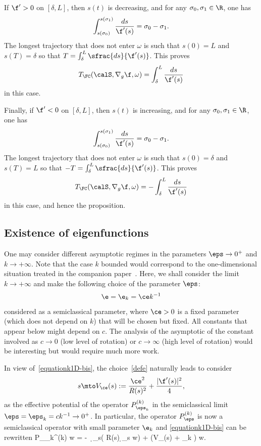 If $\f'>0$ on $[\delta, L]$, then $s(t)$ is decreasing, and for any $\sigma_0,\sigma_1\in \R$, one has
\[
\int_{s(\sigma_0)}^{s(\sigma_1)} \frac{ds}{\f'(s)} =\sigma_0- \sigma_1.
\]
The longest trajectory that does not enter $\omega$ is such that $s(0) = L$ and $s(T) =\delta$ so that $T = \int_\delta^{L} \sfrac{ds}{\f'(s)}$. This proves
\[
T_{\FC}(\calS,\nabla_g\f,\omega) = \int_\delta^{L} \frac{ds}{\f'(s)}
\]
in this case.

Finally, if $\f' <0$ on $[\delta, L]$, then $s(t)$ is increasing, and for any $\sigma_0,\sigma_1\in \R$, one has
\[
\int_{s(\sigma_0)}^{s(\sigma_1)} \frac{ds}{\f'(s)} =\sigma_0- \sigma_1.
\]
The longest trajectory that does not enter $\omega$ is such that $s(0) = \delta$ and $s(T) =L$ so that $-T = \int_\delta^{L} \sfrac{ds}{\f'(s)}$. This proves
\[
T_{\FC}(\calS,\nabla_g\f,\omega) = - \int_\delta^{L} \frac{ds}{\f'(s)}
\]
in this case, and hence the proposition.
\enp

\subsection{Existence of eigenfunctions}
\label{s:revol-eig}
One may consider different asymptotic regimes in the parameters $\eps\to 0^+$ and $k \to + \infty$. Note that the case $k$ bounded would correspond to the one-dimensional situation treated in the companion paper~\cite{LL:20-1D}.
Here, we shall consider the limit $k \to + \infty$ and make the following choice of the parameter $\eps$:
\begin{equation}
\label{defe}
\e=\e_k=\ce k^{-1}
\end{equation}
considered as a semiclassical parameter, where $\ce> 0$ is a fixed parameter (\ie which does not depend on $k$) that will be chosen but fixed. All constants that appear below might depend on $c$. The analysis of the asymptotic of the constant involved as $c\to0$ (low level of rotation) or $c\to\infty$ (high level of rotation) would be interesting but would require much more work.

In view of~\eqref{equationk1D-bis}, the choice~\eqref{defe} naturally leads to consider
\begin{equation}
\label{e:def-Vc}
s \mto V_\ce (s) := \frac{\ce^2}{R(s)^2} + \frac{| \f'(s)|^2}{4},
\end{equation}
as the effective potential of the operator $P_{\eps_k}^{(k)}$ in the semiclassical limit $\eps= \eps_k = c k^{-1} \to 0^+$. In particular, the operator $P_{\eps}^{(k)} $ is now a semiclassical operator with small parameter $\e_{k}$ and \eqref{equationk1D-bis} can be rewritten
\baln
\label{equationk1D-bisbis}
P_{\eps_{k}}^{(k)} w = - \, \d_s( R(s) \d_s w) + \left(V_\ce (s) + \eps_{k} \qf\right) w.
\naln

